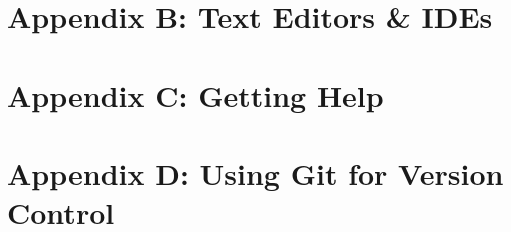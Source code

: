 \documentclass[oneside]{book}
\numberwithin{equation}{section}
\begin{document}

\section{Appendix B: Text Editors \& IDEs}


\section{Appendix C: Getting Help}


\section{Appendix D: Using Git for Version Control}



\printbibliography[heading=bibintoc]
	
\end{document}
